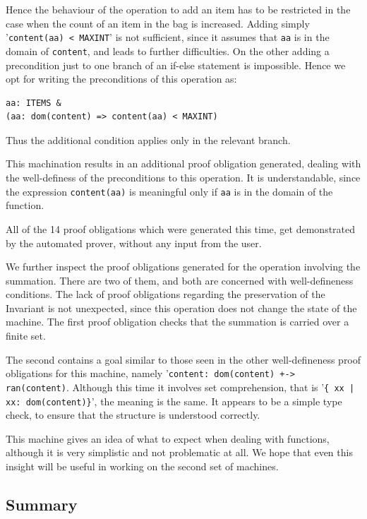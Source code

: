 \documentclass[12pt,journal,duplex]{IEEEtran}
\begin{document}
	Hence the behaviour of the operation to add an item has to be restricted in the case when the count of an item in the bag is increased. Adding simply '\texttt{content(aa) < MAXINT}' is not sufficient, since it assumes that \texttt{aa} is in the domain of \texttt{content}, and leads to further difficulties. On the other adding a precondition just to one branch of an if-else statement is impossible. Hence we opt for writing the preconditions of this operation as:
	\begin{lstlisting}
aa: ITEMS &
(aa: dom(content) => content(aa) < MAXINT)
	\end{lstlisting}
	Thus the additional condition applies only in the relevant branch.

	This machination results in an additional proof obligation generated, dealing with the well-definess of the preconditions to this operation. It is understandable, since the expression \texttt{content(aa)} is meaningful only if \texttt{aa} is in the domain of the function.

	All of the 14 proof obligations which were generated this time, get demonstrated by the automated prover, without any input from the user.

	We further inspect the proof obligations generated for the operation involving the summation. There are two of them, and both are concerned with well-defineness conditions. The lack of proof obligations regarding the preservation of the Invariant is not unexpected, since this operation does not change the state of the machine. The first proof obligation checks that the summation is carried over a finite set.

	The second contains a goal similar to those seen in the other well-defineness proof obligations for this machine, namely '\texttt{content: dom(content) +-> ran(content)}. Although this time it involves set comprehension, that is '\texttt{\{~xx | xx: dom(content)\}}', the meaning is the same. It appears to be a simple type check, to ensure that the structure is understood correctly.

	This machine gives an idea of what to expect when dealing with functions, although it is very simplistic and not problematic at all. We hope that even this insight will be useful in working on the second set of machines.

	\subsection{Summary}
\end{document}
